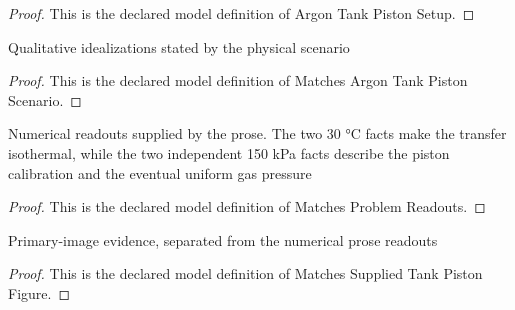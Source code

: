 \begin{proof}
  This is the declared model definition of Argon Tank Piston Setup.
\end{proof}
\begin{definition}
  \label{def:physics:phyx-mini-0449:phyxminiproblems-problemphyxmini0449-matchesargontankpistonscenario}
  Qualitative idealizations stated by the physical scenario
\end{definition}
\begin{proof}
  This is the declared model definition of Matches Argon Tank Piston Scenario.
\end{proof}
\begin{definition}
  \label{def:physics:phyx-mini-0449:phyxminiproblems-problemphyxmini0449-matchesproblemreadouts}
  Numerical readouts supplied by the prose. The two 30 °C facts make the transfer isothermal, while the two independent 150 kPa facts describe the piston calibration and the eventual uniform gas pressure
\end{definition}
\begin{proof}
  This is the declared model definition of Matches Problem Readouts.
\end{proof}
\begin{definition}
  \label{def:physics:phyx-mini-0449:phyxminiproblems-problemphyxmini0449-matchessuppliedtankpistonfigure}
  Primary-image evidence, separated from the numerical prose readouts
\end{definition}
\begin{proof}
  This is the declared model definition of Matches Supplied Tank Piston Figure.
\end{proof}
